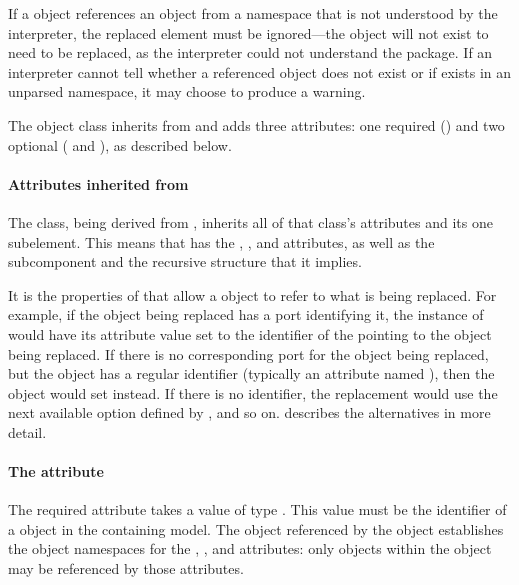 If a \ReplacedElement object references an object from a namespace that
is not understood by the interpreter, the replaced element must be
ignored---the object will not exist to need to be replaced, as the
interpreter could not understand the package.  If an interpreter cannot
tell whether a referenced object does not exist or if exists in an
unparsed namespace, it may choose to produce a warning.

The \ReplacedElement object class inherits from \SBaseRef and adds three
attributes: one required () and two optional
( and ), as described below.


\paragraph{Attributes inherited from }

The \ReplacedElement class, being derived from \SBaseRef, inherits all
of that class's attributes and its one subelement.  This means that
\ReplacedElement has the , , 
and  attributes, as well as the subcomponent
 and the recursive structure that it implies.

It is the properties of \SBaseRef that allow a \ReplacedElement object
to refer to what is being replaced.  For example, if the object being
replaced has a port identifying it, the instance of \ReplacedElement
would have its  attribute value set to the identifier of
the \Port pointing to the object being replaced.  If there is no
corresponding port for the object being replaced, but the object has a
regular identifier (typically an attribute named ), then the
\ReplacedElement object would set  instead.  If there is no
identifier, the replacement would use the next available option defined
by \SBaseRef, and so on.   describes the
alternatives in more detail.


\paragraph{The \fixttspace{} attribute}
\label{replacedelement-submodelref}

The required attribute  takes a value of type
.  This value must be the identifier of a \Submodel
object in the containing model.  The \Model object referenced by the
\Submodel object establishes the object namespaces for the
, ,  and 
attributes: only objects within the \Model object may be referenced by
those attributes.


